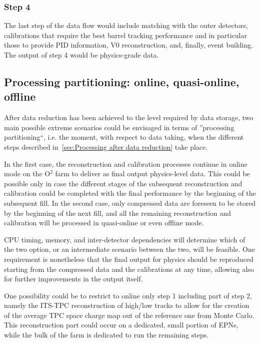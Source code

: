 \subsubsection{Step 4}
\label{sec:Step 4}
The last step of the data flow would include matching with the outer detectors, calibrations that require the best barrel tracking 
performance and in particular those to provide PID information, V0 reconstruction, and, finally, event building. The output of step 
4 would be physics-grade data. 

\subsection{Processing partitioning: online, quasi-online, offline}
\label{sec:Processing partitioning: online, quasi-online, offline}
After data reduction has been achieved to the level required by data storage, two main possible extreme scenarios could 
be envisaged in terms of ''processing partitioning``, i.e. the moment, with respect to data taking, when the different steps
described in~\ref{sec:Processing after data reduction} take place.
 
In the first case, the reconstruction and calibration processes continue in online mode on the O$^2$ farm to deliver
as final output physics-level data. This could be possible only in case the different stages of the subsequent 
reconstruction and calibration could be completed with the final performance by the beginning of the subsequent
fill. In the second case, only compressed data are foreseen to be stored by the beginning of the next fill, and all 
the remaining reconstruction and calibration will be processed in quasi-online or even offline mode. 

CPU timing, memory, and inter-detector dependencies will determine which of the two option, or an intermediate
scenario between the two, will be feasible. One requirement is nonetheless that the final output for physics should be
reproduced starting from the compressed data and the calibrations at any time, allowing also for further improvements 
in the output itself. 

One possibility could be to restrict to online only step 1 including part of step 2, namely the ITS-TPC reconstruction 
of high/low \pt tracks to allow for the creation of the average TPC space charge map out of the reference one from
Monte Carlo. This reconstruction part could occur on a dedicated, small portion of EPNs, while the bulk of the farm
is dedicated to run the remaining steps. 


